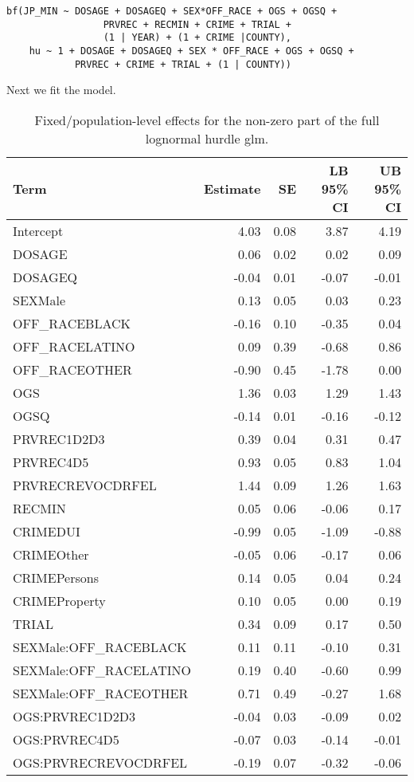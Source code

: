 \documentclass[
  letterpaper,
  DIV=11,
  numbers=noendperiod]{scrartcl}
\begin{document}
\begin{verbatim}
bf(JP_MIN ~ DOSAGE + DOSAGEQ + SEX*OFF_RACE + OGS + OGSQ +
                 PRVREC + RECMIN + CRIME + TRIAL +
                 (1 | YEAR) + (1 + CRIME |COUNTY),
    hu ~ 1 + DOSAGE + DOSAGEQ + SEX * OFF_RACE + OGS + OGSQ +
            PRVREC + CRIME + TRIAL + (1 | COUNTY))
\end{verbatim}

Next we fit the model.

\hypertarget{tbl-brms-hurdle-model-summary-2}{}
\begin{table}
\caption{\label{tbl-brms-hurdle-model-summary-2}Fixed/population-level effects for the non-zero part of the full
lognormal hurdle glm. }\tabularnewline

\centering
\begin{tabular}{lrrrr}
\toprule
Term & Estimate & SE & LB 95\% CI & UB 95\% CI\\
\midrule
Intercept & 4.03 & 0.08 & 3.87 & 4.19\\
DOSAGE & 0.06 & 0.02 & 0.02 & 0.09\\
DOSAGEQ & -0.04 & 0.01 & -0.07 & -0.01\\
SEXMale & 0.13 & 0.05 & 0.03 & 0.23\\
OFF\_RACEBLACK & -0.16 & 0.10 & -0.35 & 0.04\\
\addlinespace
OFF\_RACELATINO & 0.09 & 0.39 & -0.68 & 0.86\\
OFF\_RACEOTHER & -0.90 & 0.45 & -1.78 & 0.00\\
OGS & 1.36 & 0.03 & 1.29 & 1.43\\
OGSQ & -0.14 & 0.01 & -0.16 & -0.12\\
PRVREC1D2D3 & 0.39 & 0.04 & 0.31 & 0.47\\
\addlinespace
PRVREC4D5 & 0.93 & 0.05 & 0.83 & 1.04\\
PRVRECREVOCDRFEL & 1.44 & 0.09 & 1.26 & 1.63\\
RECMIN & 0.05 & 0.06 & -0.06 & 0.17\\
CRIMEDUI & -0.99 & 0.05 & -1.09 & -0.88\\
CRIMEOther & -0.05 & 0.06 & -0.17 & 0.06\\
\addlinespace
CRIMEPersons & 0.14 & 0.05 & 0.04 & 0.24\\
CRIMEProperty & 0.10 & 0.05 & 0.00 & 0.19\\
TRIAL & 0.34 & 0.09 & 0.17 & 0.50\\
SEXMale:OFF\_RACEBLACK & 0.11 & 0.11 & -0.10 & 0.31\\
SEXMale:OFF\_RACELATINO & 0.19 & 0.40 & -0.60 & 0.99\\
\addlinespace
SEXMale:OFF\_RACEOTHER & 0.71 & 0.49 & -0.27 & 1.68\\
OGS:PRVREC1D2D3 & -0.04 & 0.03 & -0.09 & 0.02\\
OGS:PRVREC4D5 & -0.07 & 0.03 & -0.14 & -0.01\\
OGS:PRVRECREVOCDRFEL & -0.19 & 0.07 & -0.32 & -0.06\\
\bottomrule
\end{tabular}
\end{table}
\end{document}
